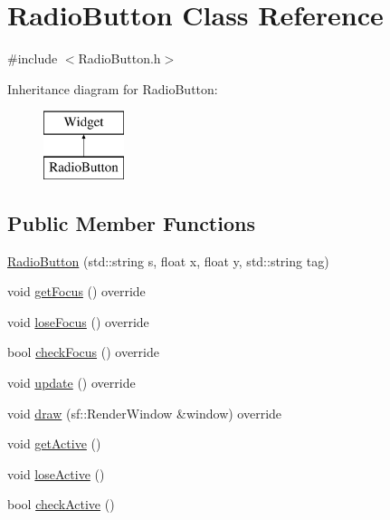 \hypertarget{class_radio_button}{}\section{Radio\+Button Class Reference}
\label{class_radio_button}


{\ttfamily \#include $<$Radio\+Button.\+h$>$}

Inheritance diagram for Radio\+Button\+:\begin{figure}[H]
\begin{center}
\leavevmode
\includegraphics[height=2.000000cm]{class_radio_button}
\end{center}
\end{figure}
\subsection*{Public Member Functions}
\begin{DoxyCompactItemize}
\item 
\mbox{\hyperlink{class_radio_button_adb0f278298ab8f6eda40f713e3791821}{Radio\+Button}} (std\+::string s, float x, float y, std\+::string tag)
\item 
void \mbox{\hyperlink{class_radio_button_a74c525b924c233535c3ee6a03fe89e3d}{get\+Focus}} () override
\item 
void \mbox{\hyperlink{class_radio_button_a5cc3b7a4eb1a2ac7aead0cf4a589baca}{lose\+Focus}} () override
\item 
bool \mbox{\hyperlink{class_radio_button_a693581ddb77b4f4c5f8e133eb1369390}{check\+Focus}} () override
\item 
void \mbox{\hyperlink{class_radio_button_add936c8d72748870cdb8f8d0416e8068}{update}} () override
\item 
void \mbox{\hyperlink{class_radio_button_aa8efb2e8d54a0293fd1058a7e49ca526}{draw}} (sf\+::\+Render\+Window \&window) override
\item 
void \mbox{\hyperlink{class_radio_button_a168305da89d8c859e170fbc50abbe5b3}{get\+Active}} ()
\item 
void \mbox{\hyperlink{class_radio_button_a2a2c14c31db623a8cbe71dd82b12e01b}{lose\+Active}} ()
\item 
bool \mbox{\hyperlink{class_radio_button_ad4e47880a03d6854e5664817015187a2}{check\+Active}} ()
\end{DoxyCompactItemize}
